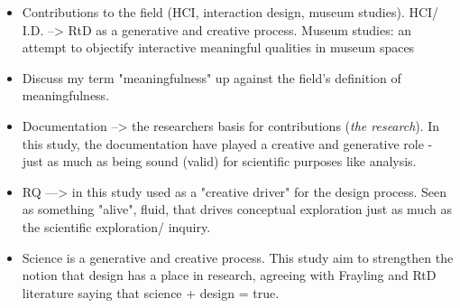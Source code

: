 \begin{itemize}
    \item Contributions to the field (HCI, interaction design, museum studies). HCI/ I.D. --> RtD as a generative and creative process. Museum studies: an attempt to objectify interactive meaningful qualities in museum spaces
    \item Discuss my term "meaningfulness" up against the field's definition of meaningfulness. 
    
    \item Documentation --> the researchers basis for contributions (\emph{the research}). In this study, the documentation have played a creative and generative role - just as much as being sound (valid) for scientific purposes like analysis. 
    \item RQ ---> in this study used as a "creative driver" for the design process. Seen as something "alive", fluid, that drives conceptual exploration just as much as the scientific exploration/ inquiry.
    \item Science is a generative and creative process. This study aim to strengthen the notion that design has a place in research, agreeing with Frayling and RtD literature saying that science + design = true. 

\end{itemize}


